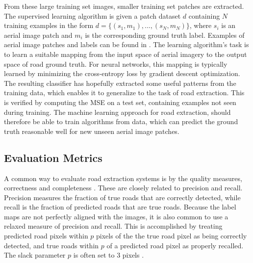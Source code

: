 From these large training set images, smaller training set patches are extracted. The supervised learning algorithm is given a patch dataset $d$ containing $N$ training examples in the form $d=\{(s_1, m_1),...,(s_N, m_N)\}$, where $s_i$ is an aerial image patch and $m_i$ is the corresponding ground truth label. Examples of aerial image patches and labels can be found in . The learning algorithm's task is to learn a suitable mapping from the input space of aerial imagery to the output space of road ground truth. For neural networks, this mapping is typically learned by minimizing the cross-entropy loss by gradient descent optimization.\\

 The resulting classifier has hopefully extracted some useful patterns from the training data, which enables it to generalize to the task of road extraction. This is verified by computing the \ac{MSE} on a test set, containing examples not seen during training. The machine learning approach for road extraction, should therefore be able to train algorithms from data, which can predict the ground truth reasonable well for new unseen aerial image patches. \\

\subsection{Evaluation Metrics}
A common way to evaluate road extraction systems is by the quality measures,  correctness and completeness \citep{Wiedemann_road_evaluation}. These are closely related to precision and recall. Precision measures the fraction of true roads that are correctly detected, while recall is the fraction of predicted roads that are true roads. Because the label maps are not perfectly aligned with the images, it is also common to use a relaxed measure of precision and recall. This is accomplished by treating predicted road pixels within $p$ pixels of the the true road pixel as being correctly detected, and true roads within $p$ of a predicted road pixel as properly recalled. The slack parameter $p$ is often set to 3 pixels \citep{Mnih_roads_high_res_aerial_images}.

